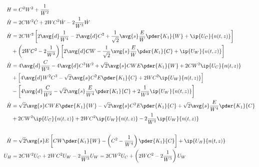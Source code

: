 \begin{equation}
\begin{split}
H &= C^2 W^2 + \frac{1}{W^2}\\
\dot{H} &= 2CW^2 \dot{C} + 2WC^2 \dot{W} - 2\frac{1}{W^3}\dot{W}\\
\dot{H} &= 2CW^2 \left[2 \avg{d} \frac{1}{W^4}  - 2 \avg{d} C^2 + \frac{1}{\sqrt{2}}\avg{s} \frac{E}{W} \pder{K_1}{W} + \ip{U_C}{ n(t,z)}\right] \\ 
        &  + \left(2WC^2 - 2\frac{1}{W^3} \right)\left[ 2 \avg{d} C W - \frac{1}{\sqrt{2}} \avg{s} \frac{E}{W} \pder{K_1}{C}+\ip{U_W}{ n(t,z)}\right] \\ 
\dot{H} &= 4 \avg{d} \frac{C }{W^2}  - 4 \avg{d} C^3W^2 + \sqrt{2}\avg{s} CW E \pder{K_1}{W} + 2CW^2 \ip{U_C}{ n(t,z)} \\ 
        &  + \left[ 4 \avg{d}W^2C^3 - \sqrt{2} \avg{s}  C^2 E \pder{K_1}{C} + 2WC^2 \ip{U_W}{ n(t,z)}\right] \\ 
        &  - \left[ 4\avg{d} \frac{C}{W^2} - \sqrt{2}\avg{s} \frac{E}{W^4} \pder{K_1}{C}+ 2\frac{1}{W^3}\ip{U_W}{ n(t,z)}\right] \\ 
\dot{H} &=   \sqrt{2}\avg{s} CW E \pder{K_1}{W} - \sqrt{2} \avg{s}  C^2 E \pder{K_1}{C} + \sqrt{2}\avg{s} \frac{E}{W^4} \pder{K_1}{C}\\
&+ 2CW^2 \ip{U_C}{ n(t,z)}  + 2WC^2 \ip{U_W}{ n(t,z)} - 2\frac{1}{W^3}\ip{U_W}{ n(t,z)} \\  \\
\dot{H} &=   \sqrt{2}\avg{s}E\left[ CW \pder{K_1}{W} - \left(C^2  - \frac{1}{W^4}\right) \pder{K_1}{C}\right]+ \ip{U_H}{ n(t,z)}  \\ 
U_H  &= 2CW^2 U_C  + 2WC^2 U_W - 2\frac{1}{W^3} U_W = 2CW^2 U_C  + \left(2WC^2 - 2\frac{1}{W^3}\right) U_W \\ 
\end{split}
\end{equation}

